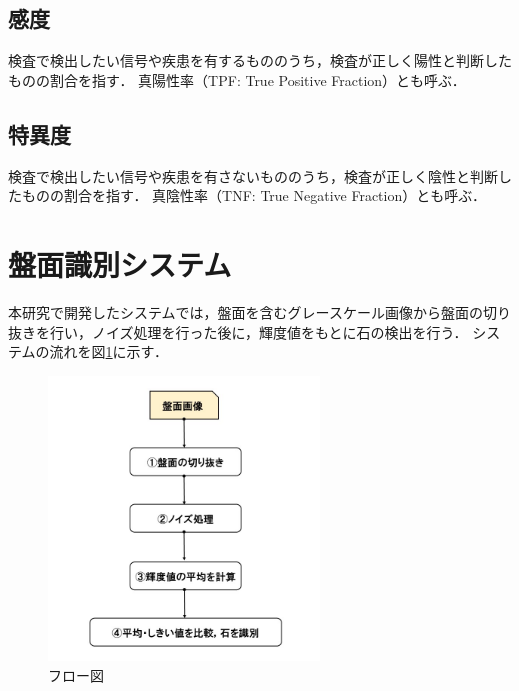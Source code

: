 \documentclass[openright]{nitocs}
\numberwithin{equation}{section}
\begin{document}
        \subsection{感度} %
        検査で検出したい信号や疾患を有するもののうち，検査が正しく陽性と判断したものの割合を指す．
        真陽性率（TPF: True Positive Fraction）とも呼ぶ．

        \subsection{特異度} %
        検査で検出したい信号や疾患を有さないもののうち，検査が正しく陰性と判断したものの割合を指す．
        真陰性率（TNF: True Negative Fraction）とも呼ぶ．

    \section{盤面識別システム} %
        本研究で開発したシステムでは，盤面を含むグレースケール画像から盤面の切り抜きを行い，ノイズ処理を行った後に，輝度値をもとに石の検出を行う．
        システムの流れを図\ref{flow}に示す．%
        \begin{figure} %
            \begin{center}
            \includegraphics[width=72mm,height=75.6mm]{flow.jpg} 
            \caption{フロー図}
            \label{flow}
            \end{center}
        \end{figure}
\end{document}
